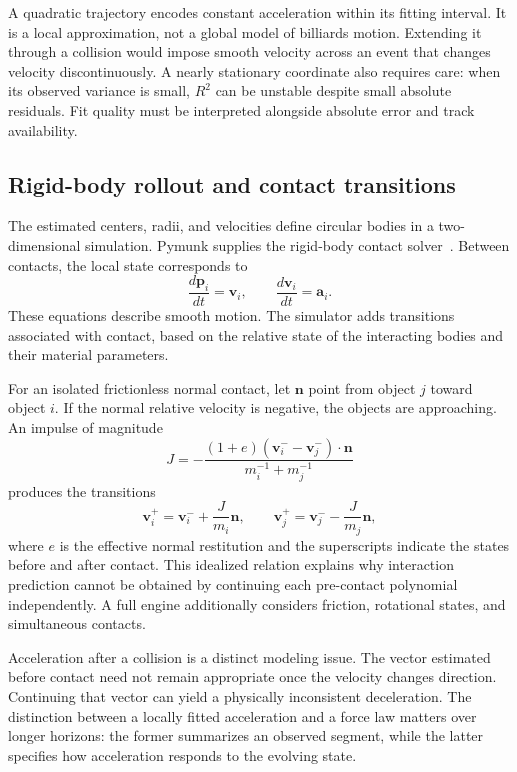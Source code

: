 \documentclass{article}
\newcommand{\pos}{\mathbf{p}}
\newcommand{\vel}{\mathbf{v}}
\newcommand{\acc}{\mathbf{a}}
\begin{document}
A quadratic trajectory encodes constant acceleration within its fitting interval. It is a local approximation, not a global model of billiards motion. Extending it through a collision would impose smooth velocity across an event that changes velocity discontinuously. A nearly stationary coordinate also requires care: when its observed variance is small, $R^2$ can be unstable despite small absolute residuals. Fit quality must be interpreted alongside absolute error and track availability.

\subsection{Rigid-body rollout and contact transitions}

The estimated centers, radii, and velocities define circular bodies in a two-dimensional simulation. Pymunk supplies the rigid-body contact solver~\citep{pymunk}. Between contacts, the local state corresponds to
\begin{equation}
  \frac{d\pos_i}{dt}=\vel_i,\qquad
  \frac{d\vel_i}{dt}=\acc_i.
\end{equation}
These equations describe smooth motion. The simulator adds transitions associated with contact, based on the relative state of the interacting bodies and their material parameters.

For an isolated frictionless normal contact, let $\mathbf n$ point from object $j$ toward object $i$. If the normal relative velocity is negative, the objects are approaching. An impulse of magnitude
\begin{equation}
  J=-\frac{(1+e)(\vel_i^- -\vel_j^-)\cdot\mathbf n}
  {m_i^{-1}+m_j^{-1}}
  \label{eq:impulse}
\end{equation}
produces the transitions
\begin{equation}
  \vel_i^+=\vel_i^-+\frac{J}{m_i}\mathbf n,\qquad
  \vel_j^+=\vel_j^--\frac{J}{m_j}\mathbf n,
\end{equation}
where $e$ is the effective normal restitution and the superscripts indicate the states before and after contact. This idealized relation explains why interaction prediction cannot be obtained by continuing each pre-contact polynomial independently. A full engine additionally considers friction, rotational states, and simultaneous contacts.

Acceleration after a collision is a distinct modeling issue. The vector estimated before contact need not remain appropriate once the velocity changes direction. Continuing that vector can yield a physically inconsistent deceleration. The distinction between a locally fitted acceleration and a force law matters over longer horizons: the former summarizes an observed segment, while the latter specifies how acceleration responds to the evolving state.
\end{document}
